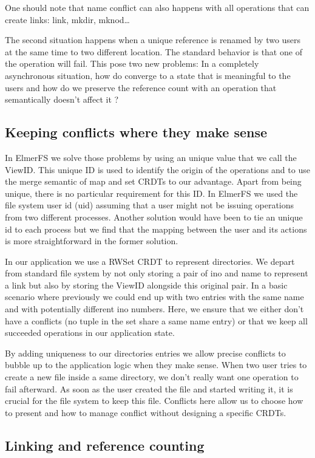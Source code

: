 \documentclass[sigplan, 10pt]{acmart}
\begin{document}
One should note that name conflict can also happens with all operations that can create links: link, mkdir, mknod\dots

The second situation happens when a unique reference is renamed
by two users at the same time to two different location. The standard behavior
is that one of the operation will fail. This pose two new problems: In a completely
asynchronous situation, how do converge to a state that is meaningful to the
users and how do we preserve the reference count with an operation that
semantically doesn't affect it ?

\subsection{Keeping conflicts where they make sense}

In ElmerFS we solve those problems by using an unique value that we call the
ViewID. This unique ID is used to identify the origin of the operations and to
use the merge semantic of map and set CRDTs to our advantage. Apart from
being unique, there is no particular requirement for this ID. In ElmerFS we used
the file system user id (uid) assuming that a user might not be
issuing operations from two different processes.
Another solution would have been to tie an unique id to each process
but we find that the mapping between the user and its actions is more
straightforward in the former solution.

In our application we use a RWSet CRDT to represent directories.
We depart from standard file system by not only storing a pair of ino
and name to represent a link but also by storing the ViewID alongside this
original pair. In a basic scenario where previously we could end up with two
entries with the same name and with potentially different ino numbers. Here, we
ensure that we either don't have a conflicts (no tuple in the set
share a same name entry) or that we keep all succeeded operations in our application state.

By adding uniqueness to our directories entries we allow precise conflicts to bubble up to the application logic when they make sense.
When two user tries to create a new file inside a same directory, we don't
really want one operation to fail afterward. As soon as the user created the
file and started writing it, it is crucial for the file system to keep this
file. Conflicts here allow us to choose how to present and how to manage
conflict without designing a specific CRDTs.

\subsection{Linking and reference counting}
\end{document}
